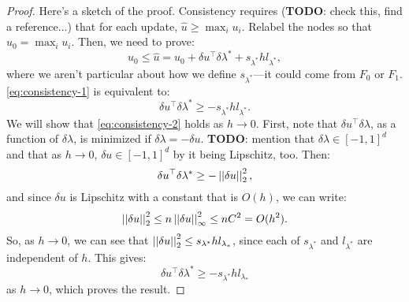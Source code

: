 \documentclass[eikonal.tex]{subfiles}
\begin{document}
\begin{proof}
  Here's a sketch of the proof. Consistency requires (\textbf{TODO}:
  check this, find a reference...) that for each update,
  $\hat{u} \geq \max_i u_i$. Relabel the nodes so that
  $u_0 = \max_i u_i$. Then, we need to prove:
  \begin{equation}
    \label{eq:consistency-1}
    u_0 \leq \hat{u} = u_0 + \delta u^\top \delta \lambda^* + s_{\lambda^*} h l_{\lambda^*},
  \end{equation}
  where we aren't particular about how we define $s_{\lambda^*}$---it
  could come from $F_0$ or $F_1$. \cref{eq:consistency-1} is
  equivalent to:
  \begin{equation}
    \label{eq:consistency-2}
    \delta u^\top \delta \lambda^* \geq -s_{\lambda^*} h l_{\lambda^*}.
  \end{equation}
  We will show that \cref{eq:consistency-2} holds as $h \to 0$. First,
  note that $\delta u^\top \delta \lambda$, as a function of
  $\delta \lambda$, is minimized if $\delta \lambda = -\delta
  u$. \textbf{TODO}: mention that $\delta \lambda \in [-1, 1]^d$ and
  that as $h \to 0$, $\delta u \in [-1, 1]^d$ by it being Lipschitz,
  too. Then:
  \begin{equation*}
    \delta u^\top \delta \lambda^* \geq -\left|\left|\delta u\right|\right|_2^2,
  \end{equation*}
  and since $\delta u$ is Lipschitz with a constant that is $O(h)$, we
  can write:
  \begin{equation*}
    \left|\left|\delta u\right|\right|_2^2 \leq n \left|\left|\delta u\right|\right|_\infty^2 \leq n C^2 = O(h^2).
  \end{equation*}
  So, as $h \to 0$, we can see that
  $\left|\left|\delta u\right|\right|_2^2 \leq s_{\lambda^*} h l_{\lambda_*}$, since each
  of $s_{\lambda^*}$ and $l_{\lambda^*}$ are independent of $h$. This
  gives:
  \begin{equation*}
    \delta u^\top \delta \lambda^* \geq -s_{\lambda^*} h l_{\lambda_*}
  \end{equation*}
  as $h \to 0$, which proves the result.
\end{proof}
\end{document}
